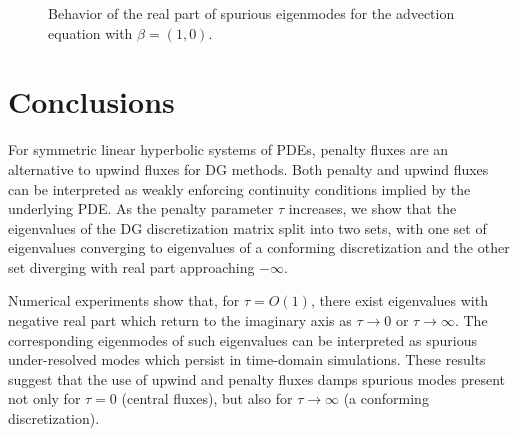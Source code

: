 \documentclass[10pt]{article}
\begin{document}
\begin{figure}
\centering
{}
\hspace{.5em}
\hspace{.5em}
\caption{Behavior of the real part of spurious eigenmodes for the advection equation with $\beta = (1,0)$. }
\label{fig:trackModesAdvecU}
\end{figure}

\section{Conclusions}

For symmetric linear hyperbolic systems of PDEs, penalty fluxes are an alternative to upwind fluxes for DG methods.  Both penalty and upwind fluxes can be interpreted as weakly enforcing continuity conditions implied by the underlying PDE.  As the penalty parameter $\tau$ increases, we show that the eigenvalues of the DG discretization matrix split into two sets, with one set of eigenvalues converging to eigenvalues of a conforming discretization and the other set diverging with real part approaching $-\infty$.  

Numerical experiments show that, for $\tau = O(1)$, there exist eigenvalues with negative real part which return to the imaginary axis as $\tau \rightarrow 0$ or $\tau\rightarrow \infty$.  The corresponding eigenmodes of such eigenvalues can be interpreted as spurious under-resolved modes which persist in time-domain simulations.  These results suggest that the use of upwind and penalty fluxes damps spurious modes present not only for $\tau = 0$ (central fluxes), but also for $\tau \rightarrow\infty$ (a conforming discretization).  




\end{document}
